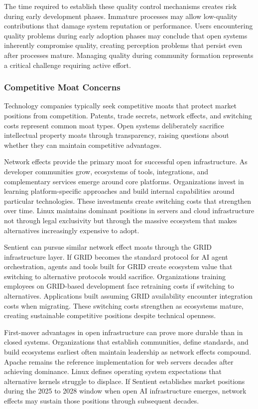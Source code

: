 The time required to establish these quality control mechanisms creates risk during early development phases. Immature processes may allow low-quality contributions that damage system reputation or performance. Users encountering quality problems during early adoption phases may conclude that open systems inherently compromise quality, creating perception problems that persist even after processes mature. Managing quality during community formation represents a critical challenge requiring active effort.

\subsubsection{Competitive Moat Concerns}

Technology companies typically seek competitive moats that protect market positions from competition. Patents, trade secrets, network effects, and switching costs represent common moat types. Open systems deliberately sacrifice intellectual property moats through transparency, raising questions about whether they can maintain competitive advantages.

Network effects provide the primary moat for successful open infrastructure. As developer communities grow, ecosystems of tools, integrations, and complementary services emerge around core platforms. Organizations invest in learning platform-specific approaches and build internal capabilities around particular technologies. These investments create switching costs that strengthen over time. Linux maintains dominant positions in servers and cloud infrastructure not through legal exclusivity but through the massive ecosystem that makes alternatives increasingly expensive to adopt.

Sentient can pursue similar network effect moats through the GRID infrastructure layer. If GRID becomes the standard protocol for AI agent orchestration, agents and tools built for GRID create ecosystem value that switching to alternative protocols would sacrifice. Organizations training employees on GRID-based development face retraining costs if switching to alternatives. Applications built assuming GRID availability encounter integration costs when migrating. These switching costs strengthen as ecosystems mature, creating sustainable competitive positions despite technical openness.

First-mover advantages in open infrastructure can prove more durable than in closed systems. Organizations that establish communities, define standards, and build ecosystems earliest often maintain leadership as network effects compound. Apache remains the reference implementation for web servers decades after achieving dominance. Linux defines operating system expectations that alternative kernels struggle to displace. If Sentient establishes market positions during the 2025 to 2028 window when open AI infrastructure emerges, network effects may sustain those positions through subsequent decades.

